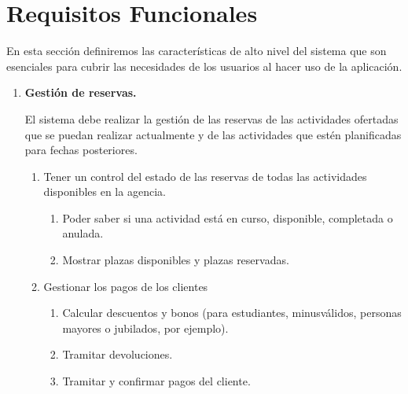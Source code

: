 \section{Requisitos Funcionales}

En esta sección definiremos las características de alto nivel del sistema que son esenciales para 
cubrir las necesidades de los usuarios al hacer uso de la aplicación.

\begin{enumerate}[label={\color{red}RF-\arabic{enumi}.}]
    \item \label{enum:RF-1}\textbf{Gestión de reservas.}
    
        El sistema debe realizar la gestión de las reservas de las actividades ofertadas que se puedan realizar 
        actualmente y de las actividades que estén planificadas para fechas posteriores.

    \begin{enumerate}[label={\color{red}\theenumi\arabic{enumii}.}]
        
        \item \label{enum:RF-1.1}Tener un control del estado de las reservas de todas las actividades disponibles en la agencia.
        \begin{enumerate}[label={\color{red}\theenumii\arabic{enumiii}.}]
            \item\label{enum:RF-1.1.1} Poder saber si una actividad está en curso, disponible, completada o anulada.
            \item\label{enum:RF-1.1.2} Mostrar plazas disponibles y plazas reservadas.
        \end{enumerate}
        \item\label{enum:RF-1.2} Gestionar los pagos de los clientes 
        \begin{enumerate}[label={\color{red}\theenumii\arabic{enumiii}.}]
            \item\label{enum:RF-1.2.1} Calcular descuentos y bonos (para estudiantes, minusválidos, personas mayores o jubilados, por ejemplo).
            \item\label{enum:RF-1.2.2} Tramitar devoluciones. 
            \item\label{enum:RF-1.2.3} Tramitar y confirmar pagos del cliente. 
        \end{enumerate}



\end{enumerate}
\end{enumerate}
